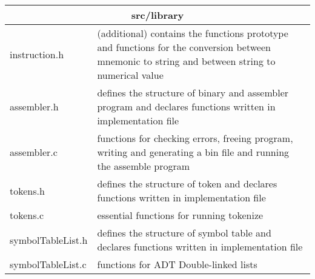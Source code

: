 \documentclass[11pt]{article}
\begin{document}
\medskip

\begin{tabular}{ |p{5cm}|p{10cm}|  }
\hline
\multicolumn{2}{|c|}{ src/library  } \\
\hline
instruction.h & (additional) contains the functions prototype and functions for
the conversion between mnemonic to string and between string to numerical
value \\
\hline
assembler.h & defines the structure of binary and assembler program and declares
  functions written in implementation file\\
 \hline
assembler.c & functions for checking errors, freeing program, writing and
generating a bin file and running the assemble program\\
\hline
tokens.h & defines the structure of token and declares  functions written in
implementation file\\
\hline
tokens.c &  essential functions for running tokenize \ \\
\hline
symbolTableList.h & defines the structure of symbol table and declares
functions written in implementation file \\
\hline
symbolTableList.c &  functions for ADT Double-linked lists \\
\hline
\end{tabular}
\end{document}
